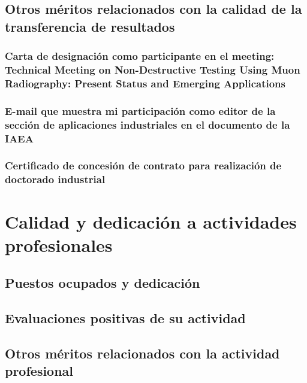 \documentclass[a4paper, 11pt, twoside, openright]{report}
\begin{document}
\subsection{Otros méritos relacionados con la calidad de la transferencia de resultados}

\subsubsection{Carta de designación como participante en el meeting: Technical Meeting on Non-Destructive Testing Using Muon Radiography: Present Status and Emerging Applications}


\subsubsection{E-mail que muestra mi participación como editor de la sección de aplicaciones industriales en el documento de la IAEA}


\subsubsection{Certificado de concesión de contrato para realización de doctorado industrial}



\section{Calidad y dedicación a actividades profesionales}

\subsection{Puestos ocupados y dedicación}

\subsection{Evaluaciones positivas de su actividad}

\subsection{Otros méritos relacionados con la actividad profesional}
\end{document}
